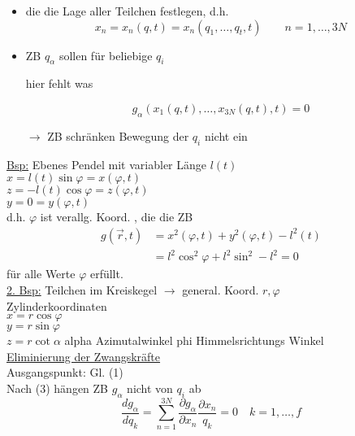 \documentclass[titlepage,12pt,a4paper,ngerman]{report}
\begin{document}
{\begin{itemize}
	\item die die Lage aller Teilchen festlegen, d.h.\\
	\begin{equation*}
	x_n = x_n (q,t) = x_n (q_1, \dots , q_t, t) \qquad n = 1,\dots,3N \tag{2}
	\end{equation*}
	\item ZB $ q_\alpha $ sollen für beliebige $ q_i $  
	
	hier fehlt was
	
	
	\begin{equation*}
	g_\alpha (x_1(q,t) , \dots , x_{3N} (q,t), t ) = 0 \tag{3}
	\end{equation*}
	\item[$ \rightarrow $] ZB schränken Bewegung der $ q_i $ nicht ein
\end{itemize}
\underline{Bsp:} Ebenes Pendel mit variabler Länge $ l(t) $\\
$ x = l(t) \sin \varphi = x(\varphi,t)$\\
$ z = - l(t) \cos \varphi = z(\varphi,t)$\\
$ y = 0 = y(\varphi,t)$\\
d.h. $ \varphi $ ist verallg. Koord. , die die ZB\\
\begin{align*}
g(\vec{r},t) &= x^2 ( \varphi,t) + y^2 ( \varphi,t ) - l^2(t) \\
&= l^2 \cos^2 \varphi + l^2 \sin^2  - l^2 = 0
\end{align*}
für alle Werte $ \varphi $ erfüllt.\\
\underline{2. Bsp:} Teilchen im Kreiskegel $ \rightarrow $ general. Koord. $ r,\varphi $\\
Zylinderkoordinaten\\
$ x = r \cos \varphi $\\
$ y = r \sin \varphi $\\
$ z = r \cot \alpha $ alpha Azimutalwinkel phi Himmelsrichtungs Winkel\\
\underline{Eliminierung der Zwangskräfte}\\
Ausgangspunkt: Gl. (1)\\
Nach (3) hängen ZB $ g_\alpha $ nicht von $ q_i $ ab
\begin{equation*}
\frac{d g_\alpha}{ d q_k} = \sum_{n=1}^{3N} \frac{\partial g_\alpha}{\partial x_n} \frac{\partial x_n}{q_k} = 0 \quad k = 1, \dots , f \tag{4}
\end{equation*}
}
\end{document}
